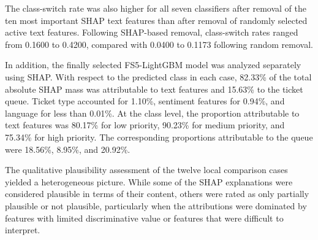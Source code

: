 The class-switch rate was also higher for all seven classifiers after removal
of the ten most important SHAP text features than after removal of randomly
selected active text features. Following SHAP-based removal, class-switch
rates ranged from 0.1600 to 0.4200, compared with 0.0400 to 0.1173 following
random removal.

In addition, the finally selected FS5-LightGBM model was analyzed separately
using SHAP. With respect to the predicted class in each case, 82.33\% of the
total absolute SHAP mass was attributable to text features and 15.63\% to the
ticket queue. Ticket type accounted for 1.10\%, sentiment features for
0.94\%, and language for less than 0.01\%. At the class level, the proportion
attributable to text features was 80.17\% for low priority, 90.23\% for
medium priority, and 75.34\% for high priority. The corresponding proportions
attributable to the queue were 18.56\%, 8.95\%, and 20.92\%.

The qualitative plausibility assessment of the twelve local comparison cases
yielded a heterogeneous picture. While some of the SHAP explanations were
considered plausible in terms of their content, others were rated as only
partially plausible or not plausible, particularly when the attributions were
dominated by features with limited discriminative value or features that were
difficult to interpret.